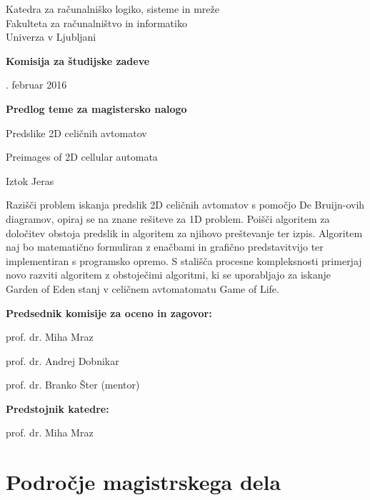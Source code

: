 \documentclass[a4paper, 12pt]{article}
\begin{document}
\noindent
Katedra za računalniško logiko, sisteme in mreže \\
Fakulteta za računalništvo in informatiko \\
Univerza v Ljubljani

\bigskip
{\bf Komisija za študijske zadeve}

. februar 2016

\bigskip
\begin{center}
{\Large\bf Predlog teme za magistersko nalogo}
\end{center}

\begin{description}[align=left,labelwidth=3cm,noitemsep,nolistsep]
\item [Naslov:]   Predslike 2D celičnih avtomatov
\item [Title:]    Preimages of 2D cellular automata
\\
\item [Kandidat:] Iztok Jeras
\\
\item [Tema naloge:] Razišči problem iskanja predslik 2D celičnih avtomatov
s pomočjo De Bruijn-ovih diagramov, opiraj se na znane rešiteve za 1D problem.
Poišči algoritem za določitev obstoja predslik in algoritem za njihovo preštevanje ter izpis.
Algoritem naj bo matematično formuliran z enačbami in grafično predstavitvijo
ter implementiran s programsko opremo.
S stališča procesne kompleksnosti primerjaj novo razviti algoritem z obstoječimi algoritmi,
ki se uporabljajo za iskanje Garden of Eden stanj v celičnem avtomatomatu Game of Life.
\end{description}

{\bf Predsednik komisije za oceno in zagovor:}
\begin{description}[align=left,labelwidth=3cm,noitemsep,nolistsep]
\item [Predsednik:] prof. dr. Miha Mraz

\item [Člani:]      prof. dr. Andrej Dobnikar
\item []            prof. dr. Branko Šter (mentor)
\end{description}

\bigskip
{\bf Predstojnik katedre:}

\bigskip
prof. dr. Miha Mraz



\clearpage

\section{Področje magistrskega dela}
\end{document}

